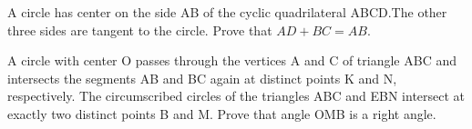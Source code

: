 \item A circle has center on the side AB of the cyclic quadrilateral ABCD.The other three sides are tangent to the circle. Prove that $AD + BC = AB$.

\item A circle with center O passes through the vertices A and C of triangle ABC and intersects the segments AB and BC again at distinct points K and N, respectively. The circumscribed circles of the triangles ABC and EBN intersect at exactly two distinct points B and M. Prove that angle OMB is a right angle.





















